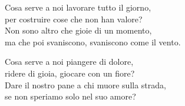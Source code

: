 

\spazio

\strofa Cosa serve a noi lavorare tutto il giorno,\\
per costruire cose che non han valore?\\
Non sono altro che gioie di un momento,\\
ma che poi svaniscono, svaniscono come il vento.

\spazio


\spazio

\strofa Cosa serve a noi piangere di dolore,\\
ridere di gioia, giocare con un fiore?\\
Dare il nostro pane a chi muore sulla strada,\\
se non speriamo solo nel suo amore?

\spazio

